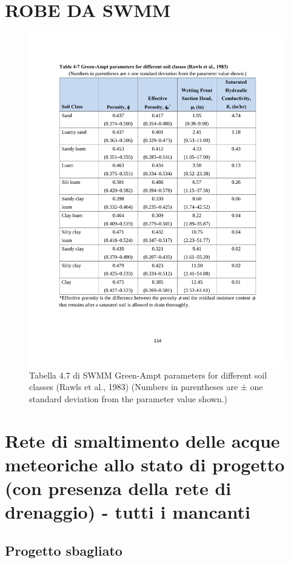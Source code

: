 \appendix
\chapter{ROBE DA SWMM}
\label{appendix:SWMM}
%
\begin{figure}[htbp]
    \centering
    \includegraphics[trim=2.5cm 4.5cm 2.5cm 3.6cm,clip,width=\textwidth]{IMG/table4-7_Ks.pdf} 
    \caption[Tabella 4.7 di SWMM]{Tabella 4.7 di SWMM Green-Ampt parameters for different soil classes (Rawls et al., 1983) (Numbers in parentheses are ± one standard deviation from the parameter value shown.)}
    \label{SWMM:tabella4-7}
\end{figure}

\chapter{Rete di smaltimento delle acque meteoriche allo stato di progetto (con presenza
della rete di drenaggio) - tutti i mancanti}
\label{appendix:FasiIntermedie}
\section{Progetto sbagliato}
